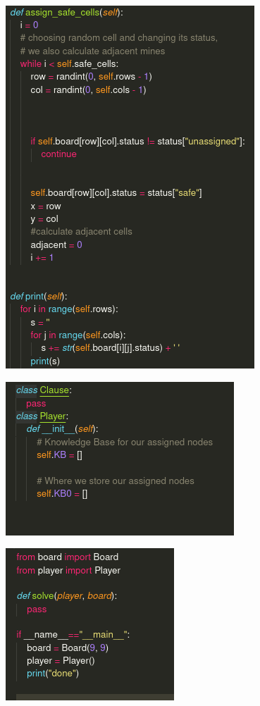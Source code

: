 \documentclass{article}
\begin{document}
\includegraphics[scale=0.5]{s2.png}

\includegraphics[scale=0.5]{s3.png}

\includegraphics[scale=0.5]{s4.png}
\end{document}

